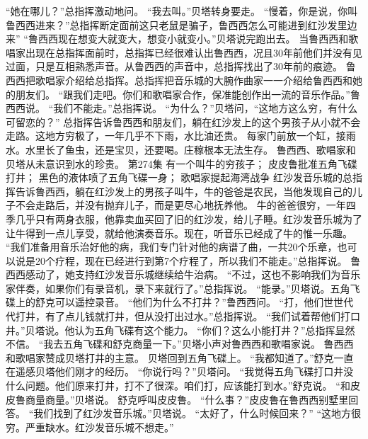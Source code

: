 \documentclass[a4paper,12pt,UTF8,twoside]{ctexbook}
\begin{document}
        “她在哪儿？”总指挥激动地问。  
        “我去叫。”贝塔转身要走。        
        “慢着，你是说，你叫鲁西西进来？”总指挥断定面前这只老鼠是骗子，鲁西西怎么可能进到红沙发里边来”  
        “鲁西西现在想变大就变大，想变小就变小。”贝塔说完跑出去。  
        当鲁西西和歌唱家出现在总指挥面前时，总指挥已经很难认出鲁西西，况且30年前他们并没有见过面，只是互相熟悉声音。从鲁西西的声音中，总指挥找出了30年前的痕迹。  
        鲁西西把歌唱家介绍给总指挥。总指挥把音乐城的大腕作曲家一一介绍给鲁西西和她的朋友们。  
        “跟我们走吧。你们和歌唱家合作，保准能创作出一流的音乐作品。”鲁西西说。  
        “我们不能走。”总指挥说。  
        “为什么？”贝塔问，“这地方这么穷，有什么可留恋的？”  
        总指挥告诉鲁西西和朋友们，躺在红沙发上的这个男孩子从小就不会走路。这地方穷极了，一年几乎不下雨，水比油还贵。  
        每家门前放一个缸，接雨水。水里长了鱼虫，还是宝贝，还要喝。庄稼根本无法生存。  
        鲁西西、歌唱家和贝塔从未意识到水的珍贵。          第274集  
        有一个叫牛的穷孩子；  
        皮皮鲁批准五角飞碟打井；  
        黑色的液体喷了五角飞碟一身；  
        歌唱家提起海湾战争    
        红沙发音乐城的总指挥告诉鲁西西，躺在红沙发上的男孩子叫牛，牛的爸爸是农民，当他发现自己的儿子不会走路后，并没有抛弃儿子，而是更尽心地抚养他。  
        牛的爸爸很穷，一年四季几乎只有两身衣服，他靠卖血买回了旧的红沙发，给儿子睡。红沙发音乐城为了让牛得到一点儿享受，就给他演奏音乐。现在，听音乐已经成了牛的惟一乐趣。  
        “我们准备用音乐治好他的病，我们专门针对他的病谱了曲，一共20个乐章，也可以说是20个疗程，现在已经进行到第7个疗程了，所以我们不能走。”总指挥说。  
        鲁西西感动了，她支持红沙发音乐城继续给牛治病。  
        “不过，这也不影响我们为音乐家伴奏，如果你们有录音机，录下来就行了。”总指挥说。  
        “能录。”贝塔说。五角飞碟上的舒克可以遥控录音。  
        “他们为什么不打井？”鲁西西问。  
        “打，他们世世代代打井，有了点儿钱就打井，但从没打出过水。”总指挥说。  
        “我们试着帮他们打口井。”贝塔说。他认为五角飞碟有这个能力。  
        “你们？这么小能打井？”总指挥显然不信。  
        “我去五角飞碟和舒克商量一下。”贝塔小声对鲁西西和歌唱家说。  
        鲁西西和歌唱家赞成贝塔打井的主意。  
        贝塔回到五角飞碟上。  
        “我都知道了。”舒克一直在遥感贝塔他们刚才的经历。  
        “你说行吗？”贝塔问。  
        “我觉得五角飞碟打口井没什么问题。他们原来打井，打不了很深。咱们打，应该能打到水。”舒克说。  
        “和皮皮鲁商量商量。”贝塔说。        
        舒克呼叫皮皮鲁。  
        “什么事？”皮皮鲁在鲁西西别墅里回答。  
        “我们找到了红沙发音乐城。”贝塔说。  
        “太好了，什么时候回来？”  
        “这地方很穷。严重缺水。红沙发音乐城不想走。”  
\end{document}

